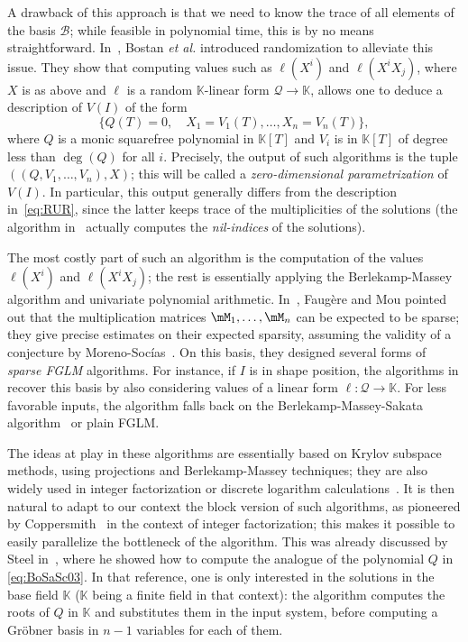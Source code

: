 \documentclass[12pt]{article}
\newcommand{\basis}{\mathscr{B}}
\newcommand{\lf}{X}
\newcommand{\residueI}{\mathscr{Q}}
\newcommand{\sqfree}{Q}
\def\K{\mathbb{K}}
\def\K {\ensuremath{\mathbb{K}}}
\begin{document}
A drawback of this approach is that we need to know the trace of all
elements of the basis $\basis$; while feasible in polynomial time,
this is by no means straightforward. In~\cite{BoSaSc03}, Bostan {\it
  et al.} introduced randomization to alleviate this issue. They show
that computing values such as $\ell(\lf^i)$ and $\ell(\lf^i X_j)$, where
$\lf$ is as above and 
$\ell$ is a random $\K$-linear form $\residueI \to \K$, allows one to deduce
a description of $V(I)$ of the form
\begin{equation}\label{eq:BoSaSc03}
 \{  \sqfree(T)=0, \quad X_1 = V_1(T), \dots,X_n = V_n(T) \},
\end{equation}
where $\sqfree$ is a monic squarefree polynomial in $\K[T]$ and $V_i$ is in
$\K[T]$ of degree less than $\deg(\sqfree)$ for all $i$. Precisely, the
output of such algorithms is the tuple $((\sqfree,V_1,\dots,V_n),\lf)$; this
will be called a {\em zero-dimensional parametrization} of $V(I)$. In
particular, this output generally differs from the description
in~\cref{eq:RUR}, since the latter keeps trace of the multiplicities
of the solutions (the algorithm in~\cite{BoSaSc03} actually computes
the {\em nil-indices} of the solutions).

The most costly part of such an algorithm is the computation of the
values $\ell(\lf^i)$ and $\ell(\lf^i X_j)$; the rest is essentially 
applying the Berlekamp-Massey algorithm and univariate
polynomial arithmetic. In~\cite{FaMo17}, Faug{\`e}re and Mou pointed
out that the multiplication matrices $\mM_1,\dots,\mM_n$ can be
expected to be sparse; they give precise estimates on their expected
sparsity, assuming the validity of a conjecture by
Moreno-Soc\'ias~\cite{MorenoSocias91}. 
On this basis, they designed several forms of {\em sparse FGLM}
algorithms. For instance, if $I$ is in shape position, the algorithms
in \cite{FaMo17} recover this basis
by also considering values of
a linear form $\ell:\residueI \to \K$. For less favorable inputs, the algorithm
falls back on the Berlekamp-Massey-Sakata algorithm~\cite{Sakata90}
or plain FGLM.

The ideas at play in these algorithms are essentially based on Krylov subspace
methods, using projections and Berlekamp-Massey techniques; they are
also widely used in integer factorization or discrete logarithm
calculations~\cite{xxx,yyy}. It is then natural to adapt to our
context the block version of such algorithms, as pioneered by
Coppersmith~\cite{Coppersmith94} in the context of integer
factorization; this makes it possible to easily parallelize the
bottleneck of the algorithm. This was already discussed by Steel
in~\cite{Steel15}, where he showed how to compute the analogue of
the polynomial $\sqfree$ in \cref{eq:BoSaSc03}. In that reference, one is
only interested in the solutions in the base field $\K$ ($\K$ being a
finite field in that context): the algorithm computes the roots of $\sqfree$
in $\K$ and substitutes them in the input system, before computing a
Gr\"obner basis in $n-1$ variables for each of them.
\end{document}
